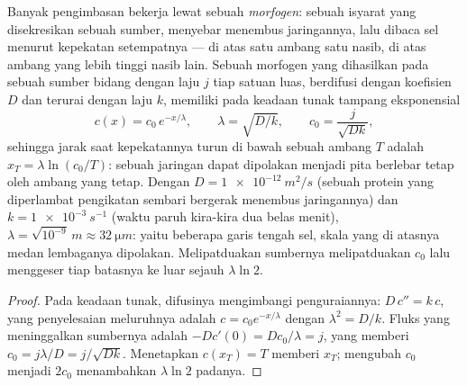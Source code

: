 \begin{theorem}\label{thm:b2:vertebrate-development:gradient}
Banyak pengimbasan bekerja lewat sebuah \emph{morfogen}: sebuah isyarat
yang disekresikan sebuah sumber, menyebar menembus jaringannya, lalu
dibaca sel menurut kepekatan setempatnya --- di atas satu ambang satu
nasib, di atas ambang yang lebih tinggi nasib lain. Sebuah morfogen
yang dihasilkan pada sebuah sumber bidang dengan laju $j$ tiap satuan
luas, berdifusi dengan koefisien $D$ dan terurai dengan laju $k$,
memiliki pada keadaan tunak tampang eksponensial
\[
c(x) = c_0\,e^{-x/\lambda}, \qquad \lambda = \sqrt{D/k}, \qquad c_0 = \frac{j}{\sqrt{Dk}},
\]
sehingga jarak saat kepekatannya turun di bawah sebuah ambang $T$
adalah $x_T = \lambda\ln(c_0/T)$: sebuah jaringan dapat dipolakan
menjadi pita berlebar tetap oleh ambang yang tetap. Dengan $D =
\qty{1e-12}{m^2/s}$ (sebuah protein yang diperlambat pengikatan sembari
bergerak menembus jaringannya) dan $k = \qty{1e-3}{s^{-1}}$ (waktu
paruh kira-kira dua belas menit), $\lambda = \sqrt{10^{-9}}\,\unit{m} \approx
\qty{32}{\micro m}$: yaitu beberapa garis tengah sel, skala
yang di atasnya medan lembaganya dipolakan. Melipatduakan sumbernya
melipatduakan $c_0$ lalu menggeser tiap batasnya ke luar sejauh $\lambda
\ln 2$.
\end{theorem}
\begin{proof}
Pada keadaan tunak, difusinya mengimbangi penguraiannya: $D\,c'' = k\,c$, yang penyelesaian meluruhnya adalah $c = c_0 e^{-x/\lambda}$
dengan $\lambda^2 =
D/k$. Fluks yang meninggalkan sumbernya adalah
$-Dc'(0) = Dc_0/\lambda = j$, yang memberi $c_0 = j\lambda/D = j/\sqrt{Dk}$. Menetapkan $c(x_T) = T$ memberi $x_T$; mengubah $c_0$
menjadi $2c_0$ menambahkan $\lambda\ln 2$ padanya.
\end{proof}

